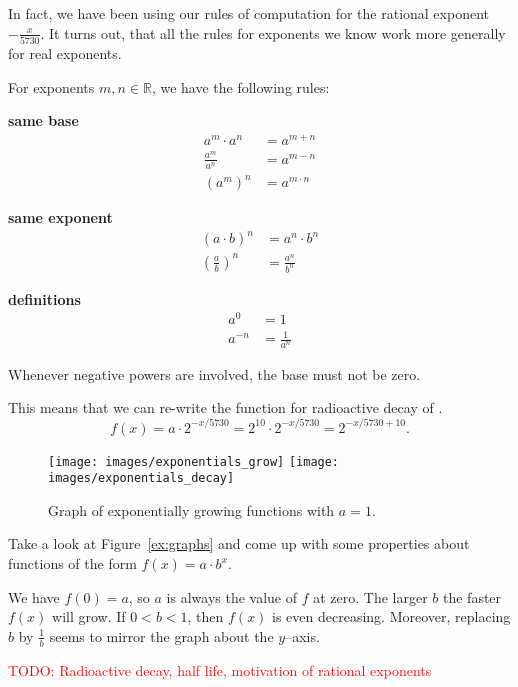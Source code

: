 In fact, we have been using our rules of computation for the rational exponent $-\frac{x}{5730}$.
It turns out, that all the rules for exponents we know work more generally for real exponents.
\begin{tcolorbox}
	For exponents $m,n\in\mathbb R$, we have the following rules:
	\begin{multicols}{3}
		\centering
		\textbf{same base}\\
		\begin{align*}
			a^m\cdot a^n&=a^{m+n} \\[10pt]
			\frac{a^m}{a^n}&=a^{m-n} \\[10pt]
			\left(a^m\right)^n&=a^{m\cdot n}
		\end{align*}
		\vfill
		\columnbreak
		
		\textbf{same exponent}\\
		\begin{align*}
			\left(a\cdot b\right)^n&=a^n\cdot b^n \\[10pt]
			\left(\frac{a}{b}\right)^n&=\frac{a^n}{b^n}
		\end{align*}
		\vfill
		\columnbreak
		
		\textbf{definitions}\\
		\begin{align*}
			a^0&=1 \\[10pt]
			a^{-n}&=\frac{1}{a^n}
		\end{align*}
		\vfill
	\end{multicols}
	Whenever negative powers are involved, the base must not be zero.
\end{tcolorbox}
This means that we can re-write the function for radioactive decay of .
\begin{equation*}
	f\left(x\right)=a\cdot 2^{-x/5730}=2^{10}\cdot 2^{-x/5730}=2^{-x/5730+10}.
\end{equation*}
\begin{figure}[ht]
	\centering
	\texttt{[image: images/exponentials\_grow]}\hfill
	\texttt{[image: images/exponentials\_decay]}
	\caption{Graph of exponentially growing functions with $a=1$.}
	\label{fig:graphs}
\end{figure}
\begin{exercise} \label{ex:graphs}
	Take a look at Figure~\ref{ex:graphs} and come up with some properties about functions of the form $f\left(x\right)=a\cdot b^x$.
\end{exercise}
\begin{solution*}
	We have $f\left(0\right)=a$, so $a$ is always the value of $f$ at zero.
	The larger $b$ the faster $f\left(x\right)$ will grow.
	If $0<b<1$, then $f\left(x\right)$ is even decreasing.
	Moreover, replacing $b$ by $\frac{1}{b}$ seems to mirror the graph about the $y$--axis.
\end{solution*}
\textcolor{red}{TODO: Radioactive decay, half life, motivation of rational exponents}